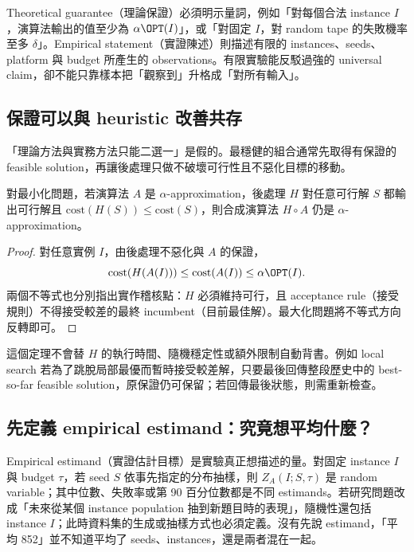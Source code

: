 \documentclass[11pt,a4paper,oneside,openany]{book}
\begin{document}
\begin{definition}
Theoretical guarantee（理論保證）必須明示量詞，例如「對每個合法 instance $I$，演算法輸出的值至少為 $\alpha\OPT(I)$」，或「對固定 $I$，對 random tape 的失敗機率至多 $\delta$」。Empirical statement（實證陳述）則描述有限的 instances、seeds、platform 與 budget 所產生的 observations。有限實驗能反駁過強的 universal claim，卻不能只靠樣本把「觀察到」升格成「對所有輸入」。
\end{definition}

\subsection{保證可以與 heuristic 改善共存}
「理論方法與實務方法只能二選一」是假的。最穩健的組合通常先取得有保證的 feasible solution，再讓後處理只做不破壞可行性且不惡化目標的移動。

\begin{theorem}
對最小化問題，若演算法 $A$ 是 $\alpha$-approximation，後處理 $H$ 對任意可行解 $S$ 都輸出可行解且 $\mathrm{cost}(H(S))\le\mathrm{cost}(S)$，則合成演算法 $H\circ A$ 仍是 $\alpha$-approximation。
\end{theorem}
\begin{proof}
對任意實例 $I$，由後處理不惡化與 $A$ 的保證，
\[
 \mathrm{cost}(H(A(I)))
 \le\mathrm{cost}(A(I))
 \le\alpha\OPT(I).
\]
兩個不等式也分別指出實作稽核點：$H$ 必須維持可行，且 acceptance rule（接受規則）不得接受較差的最終 incumbent（目前最佳解）。最大化問題將不等式方向反轉即可。
\end{proof}

這個定理不會替 $H$ 的執行時間、隨機穩定性或額外限制自動背書。例如 local search 若為了跳脫局部最優而暫時接受較差解，只要最後回傳整段歷史中的 best-so-far feasible solution，原保證仍可保留；若回傳最後狀態，則需重新檢查。

\subsection{先定義 empirical estimand：究竟想平均什麼？}
Empirical estimand（實證估計目標）是實驗真正想描述的量。對固定 instance $I$ 與 budget $\tau$，若 seed $S$ 依事先指定的分布抽樣，則 $Z_A(I;S,\tau)$ 是 random variable；其中位數、失敗率或第 90 百分位數都是不同 estimands。若研究問題改成「未來從某個 instance population 抽到新題目時的表現」，隨機性還包括 instance $I$；此時資料集的生成或抽樣方式也必須定義。沒有先說 estimand，「平均 852」並不知道平均了 seeds、instances，還是兩者混在一起。
\end{document}
